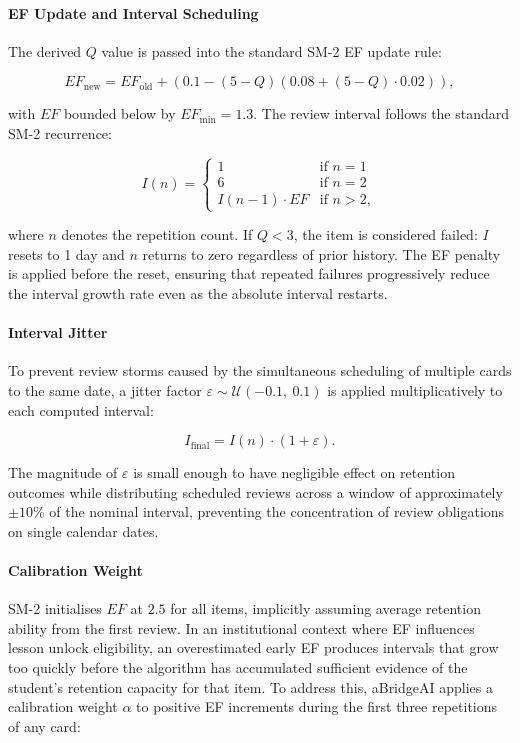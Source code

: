 \paragraph{EF Update and Interval Scheduling}
The derived $Q$ value is passed into the standard SM-2 EF 
update rule:

\begin{equation}
EF_{\text{new}} = EF_{\text{old}} + 
\left(0.1 - (5 - Q)\left(0.08 + (5 - Q) \cdot 
0.02\right)\right),
\end{equation}

with $EF$ bounded below by $EF_{\min} = 1.3$. The review 
interval follows the standard SM-2 recurrence:

\begin{equation}
I(n) =
\begin{cases}
1               & \text{if } n = 1 \\
6               & \text{if } n = 2 \\
I(n-1) \cdot EF & \text{if } n > 2,
\end{cases}
\end{equation}

where $n$ denotes the repetition count. If $Q < 3$, the item is considered failed: $I$ resets to 1 day and $n$ returns to zero regardless of prior history. The EF penalty is applied before the reset, ensuring that repeated failures progressively reduce the interval growth rate even as the absolute interval restarts.

\paragraph{Interval Jitter}
To prevent review storms caused by the simultaneous scheduling of multiple cards to the same date, a jitter factor $\varepsilon \sim \mathcal{U}(-0.1,\ 0.1)$ is applied multiplicatively to each computed interval:

\begin{equation}
I_{\text{final}} = I(n) \cdot (1 + \varepsilon).
\end{equation}

The magnitude of $\varepsilon$ is small enough to have negligible effect on retention outcomes while distributing scheduled reviews across a window of approximately $\pm 10\%$ of the nominal interval, preventing the concentration of review obligations on single calendar dates.

\paragraph{Calibration Weight}
SM-2 initialises $EF$ at $2.5$ for all items, implicitly assuming average retention ability from the first review. In an institutional context where EF influences lesson unlock eligibility, an overestimated early EF produces intervals that grow too quickly before the algorithm has accumulated sufficient evidence of the student's retention capacity for that item. To address this, aBridgeAI applies a calibration weight $\alpha$ to positive EF increments during the first three repetitions of any card:


